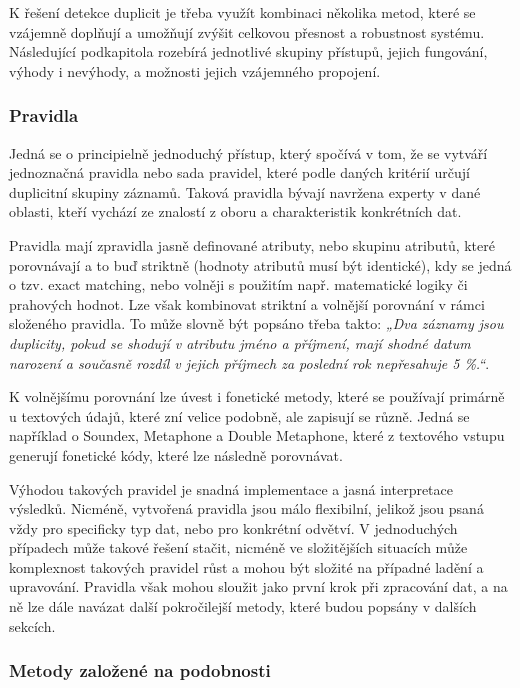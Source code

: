 K řešení detekce duplicit je třeba využít kombinaci několika metod, které se vzájemně doplňují a umožňují zvýšit celkovou přesnost a robustnost systému. Následující podkapitola rozebírá jednotlivé skupiny přístupů, jejich fungování, výhody i nevýhody, a možnosti jejich vzájemného propojení.


\subsubsection {Pravidla}
Jedná se o principielně jednoduchý přístup, který spočívá v tom, že se vytváří jednoznačná pravidla nebo sada pravidel, které podle daných kritérií určují duplicitní skupiny záznamů. Taková pravidla bývají navržena experty v dané oblasti, kteří vychází ze znalostí z oboru a charakteristik konkrétních dat.

Pravidla mají zpravidla jasně definované atributy, nebo skupinu atributů, které porovnávají a to buď striktně (hodnoty atributů musí být identické), kdy se jedná o tzv. exact matching, nebo volněji s použitím např. matematické logiky či prahových hodnot. Lze však kombinovat striktní a volnější porovnání v rámci složeného pravidla. To může slovně být popsáno třeba takto: \textit{„Dva záznamy jsou duplicity, pokud se shodují v atributu jméno a příjmení, mají shodné datum narození a současně rozdíl v jejich příjmech za poslední rok nepřesahuje 5 \%.“}.

K volnějšímu porovnání lze úvest i fonetické metody, které se používají primárně u textových údajů, které zní velice podobně, ale zapisují se různě. Jedná se například o Soundex, Metaphone a Double Metaphone, které z textového vstupu generují fonetické kódy, které lze následně porovnávat.

Výhodou takových pravidel je snadná implementace a jasná interpretace výsledků. Nicméně, vytvořená pravidla jsou málo flexibilní, jelikož jsou psaná vždy pro specificky typ dat, nebo pro konkrétní odvětví. V jednoduchých případech může takové řešení stačit, nicméně ve složitějších situacích může komplexnost takových pravidel růst a mohou být složité na případné ladění a upravování. Pravidla však mohou sloužit jako první krok při zpracování dat, a na ně lze dále navázat další pokročilejší metody, které budou popsány v dalších sekcích.

\subsubsection {Metody založené na podobnosti}

